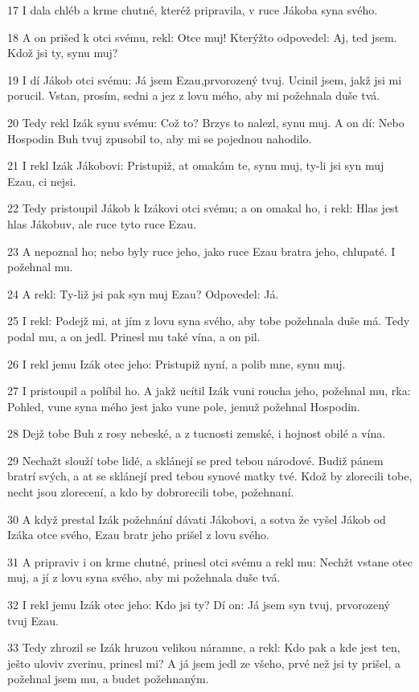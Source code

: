 \par 17 I dala chléb a krme chutné, kteréž pripravila, v ruce Jákoba syna svého.
\par 18 A on prišed k otci svému, rekl: Otce muj! Kterýžto odpovedel: Aj, ted jsem. Kdož jsi ty, synu muj?
\par 19 I dí Jákob otci svému: Já jsem Ezau,prvorozený tvuj. Ucinil jsem, jakž jsi mi porucil. Vstan, prosím, sedni a jez z lovu mého, aby mi požehnala duše tvá.
\par 20 Tedy rekl Izák synu svému: Což to? Brzys to nalezl, synu muj. A on dí: Nebo Hospodin Buh tvuj zpusobil to, aby mi se pojednou nahodilo.
\par 21 I rekl Izák Jákobovi: Pristupiž, at omakám te, synu muj, ty-li jsi syn muj Ezau, ci nejsi.
\par 22 Tedy pristoupil Jákob k Izákovi otci svému; a on omakal ho, i rekl: Hlas jest hlas Jákobuv, ale ruce tyto ruce Ezau.
\par 23 A nepoznal ho; nebo byly ruce jeho, jako ruce Ezau bratra jeho, chlupaté. I požehnal mu.
\par 24 A rekl: Ty-liž jsi pak syn muj Ezau? Odpovedel: Já.
\par 25 I rekl: Podejž mi, at jím z lovu syna svého, aby tobe požehnala duše má. Tedy podal mu, a on jedl. Prinesl mu také vína, a on pil.
\par 26 I rekl jemu Izák otec jeho: Pristupiž nyní, a polib mne, synu muj.
\par 27 I pristoupil a políbil ho. A jakž ucítil Izák vuni roucha jeho, požehnal mu, rka: Pohled, vune syna mého jest jako vune pole, jemuž požehnal Hospodin.
\par 28 Dejž tobe Buh z rosy nebeské, a z tucnosti zemské, i hojnost obilé a vína.
\par 29 Nechažt slouží tobe lidé, a sklánejí se pred tebou národové. Budiž pánem bratrí svých, a at se sklánejí pred tebou synové matky tvé. Kdož by zlorecili tobe, necht jsou zlorecení, a kdo by dobrorecili tobe, požehnaní.
\par 30 A když prestal Izák požehnání dávati Jákobovi, a sotva že vyšel Jákob od Izáka otce svého, Ezau bratr jeho prišel z lovu svého.
\par 31 A pripraviv i on krme chutné, prinesl otci svému a rekl mu: Nechžt vstane otec muj, a jí z lovu syna svého, aby mi požehnala duše tvá.
\par 32 I rekl jemu Izák otec jeho: Kdo jsi ty? Dí on: Já jsem syn tvuj, prvorozený tvuj Ezau.
\par 33 Tedy zhrozil se Izák hruzou velikou náramne, a rekl: Kdo pak a kde jest ten, ješto uloviv zverinu, prinesl mi? A já jsem jedl ze všeho, prvé než jsi ty prišel, a požehnal jsem mu, a budet požehnaným.
